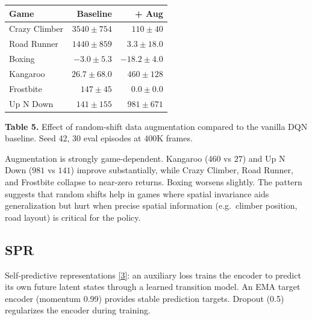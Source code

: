 \documentclass[11pt]{article}
\newcommand{\citelink}[2]{\href{#1}{\small[#2]}}
\begin{document}
\begin{table}[h]
\centering
\renewcommand{\arraystretch}{1.4}
\setlength{\tabcolsep}{12pt}
\begin{tabular}{l r r}
\toprule
\textbf{Game} & \textbf{Baseline} & \textbf{+ Aug} \\
\midrule
Crazy Climber  & $3540 \pm 754$   & $110 \pm 40$ \\
Road Runner    & $1440 \pm 859$   & $3.3 \pm 18.0$ \\
Boxing         & $-3.0 \pm 5.3$   & $-18.2 \pm 4.0$ \\
Kangaroo       & $26.7 \pm 68.0$  & $460 \pm 128$ \\
Frostbite      & $147 \pm 45$     & $0.0 \pm 0.0$ \\
Up N Down      & $141 \pm 155$    & $981 \pm 671$ \\
\bottomrule
\end{tabular}

\vspace{1.2em}
{\raggedright\small \textbf{Table 5.} Effect of random-shift data
augmentation compared to the vanilla DQN baseline. Seed 42, 30 eval
episodes at 400K frames.\par}
\end{table}

\noindent Augmentation is strongly game-dependent. Kangaroo
($460$ vs $27$) and Up N Down ($981$ vs $141$) improve substantially,
while Crazy Climber, Road Runner, and Frostbite collapse to near-zero
returns. Boxing worsens slightly. The pattern suggests that random
shifts help in games where spatial invariance aids generalization but
hurt when precise spatial information (e.g.\ climber position, road
layout) is critical for the policy.

\subsection{SPR}

Self-predictive representations
\citelink{https://arxiv.org/abs/2007.05929}{3}: an auxiliary loss
trains the encoder to predict its own future latent states through a
learned transition model. An EMA target encoder (momentum 0.99)
provides stable prediction targets. Dropout (0.5) regularizes the
encoder during training.
\end{document}

